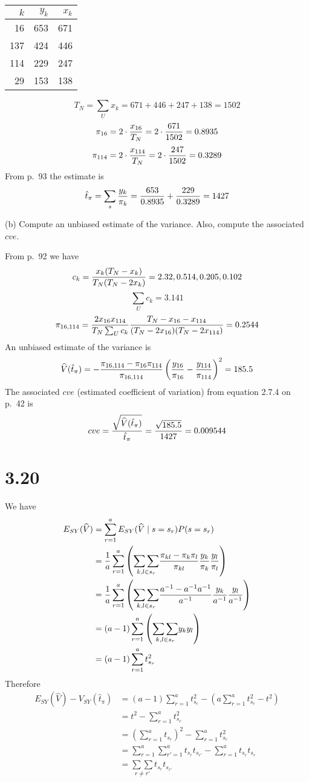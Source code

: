 \documentclass[12pt]{article}
\begin{document}
\begin{center}
\begin{tabular}{|r|r|r|}
\hline
$k$ & $y_k$ & $x_k$\\
\hline
16 & 653 & 671\\
137 & 424 & 446\\
114 & 229 & 247\\
29 & 153 & 138\\
\hline
\end{tabular}
\end{center}

\[
T_N=\sum_U x_k=671+446+247+138=1502
\]
\[
\pi_{16}=2\cdot{x_{16}\over T_N}=2\cdot{671\over1502}=0.8935
\]
\[
\pi_{114}=2\cdot{x_{114}\over T_N}=2\cdot{247\over1502}=0.3289
\]
From p.\ 93 the estimate is
\[
\hat t_\pi=\sum_s{y_k\over\pi_k}={653\over0.8935}+{229\over0.3289}
=1427
\]

(b) Compute an unbiased estimate of the variance. Also, compute the associated
$cve$.

From p.\ 92 we have
\[
c_k={x_k(T_N-x_k)\over T_N(T_N-2x_k)}=2.32, 0.514, 0.205, 0.102
\]
\[
\sum_Uc_k=3.141
\]
\[
\pi_{16,114}={2x_{16}x_{114}\over T_N\sum_U c_k}
{T_N-x_{16}-x_{114}\over(T_N-2x_{16})(T_N-2x_{114})}=0.2544
\]
An unbiased estimate of the variance is
\[
\widehat V(\hat t_\pi)=-{\pi_{16,114}-\pi_{16}\pi_{114}\over\pi_{16,114}}
\left({y_{16}\over\pi_{16}}-{y_{114}\over\pi_{114}}\right)^2=185.5
\]
The associated $cve$ (estimated coefficient of variation) from equation 2.7.4 on
p.\ 42 is
\[
cve={\sqrt{\widehat V(\hat t_\pi)}\over\hat t_\pi}={\sqrt{185.5}\over1427}=0.009544
\]


\section*{3.20}
We have
\begin{align*}
E_{SY}(\widehat V)&=\sum_{r=1}^aE_{SY}(\widehat V\mid s=s_r)P(s=s_r)\\
&=
{1\over a}\sum_{r=1}^a\left(
\underset{k,l\in s_r}{\sum\sum}
{\pi_{kl}-\pi_k\pi_l\over\pi_{kl}}{y_k\over\pi_k}{y_l\over\pi_l}\right)\\
&=
{1\over a}\sum_{r=1}^a\left(
\underset{k,l\in s_r}{\sum\sum}
{a^{-1}-a^{-1}a^{-1}\over a^{-1}}
{y_k\over a^{-1}}
{y_l\over a^{-1}}\right)\\
&=(a-1)\sum_{r=1}^a\left(\underset{k,l\in s_r}{\sum\sum}y_ky_l\right)\\
&=(a-1)\sum_{r=1}^at_{s_r}^2
\end{align*}
Therefore
\begin{align*}
E_{SY}(\widehat V)-V_{SY}(\hat t_\pi)
&=
(a-1)\sum_{r=1}^at_{s_r}^2-\left(a\sum_{r=1}^at_{s_r}^2-t^2\right)\\
&=
t^2-\sum_{r=1}^at_{s_r}^2\\
&=
\left(\sum_{r=1}^at_{s_r}\right)^2-\sum_{r=1}^at_{s_r}^2\\
&=
\sum_{r=1}^a\sum_{r'=1}^at_{s_r}t_{s_{r'}}-\sum_{r=1}^at_{s_r}t_{s_r}\\
&=
\underset{r\ne r'}{\sum\sum}t_{s_r}t_{s_{r'}}
\end{align*}
\end{document}

